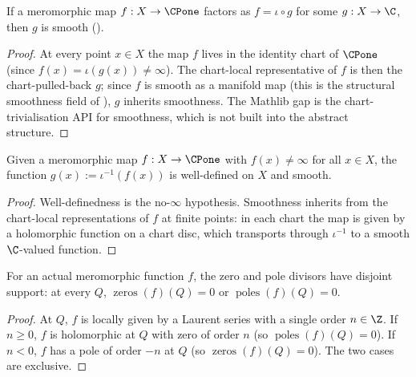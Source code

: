 \begin{lemma}
\label{lem:onepoint-lift-smoothness-inherits}
If a meromorphic map \(f:X\to\CPone\) factors as
\(f=\iota\circ g\) for some \(g:X\to\C\), then \(g\) is smooth
().

\end{lemma}
\begin{proof}

At every point \(x\in X\) the map \(f\) lives in the identity chart
of \(\CPone\) (since \(f(x)=\iota(g(x))\neq\infty\)). The chart-local
representative of \(f\) is then the chart-pulled-back \(g\); since
\(f\) is smooth as a manifold map (this is the structural smoothness
field of ), \(g\) inherits smoothness.
The Mathlib gap is the chart-trivialisation API for
 smoothness, which is not built into
the abstract structure.
\end{proof}

\begin{lemma}
\label{lem:meromorphic-finite-lift-smooth}
Given a meromorphic map \(f:X\to\CPone\) with \(f(x)\neq\infty\) for
all \(x\in X\), the function \(g(x):=\iota^{-1}(f(x))\) is well-defined
on \(X\) and smooth.

\end{lemma}
\begin{proof}

Well-definedness is the no-\(\infty\) hypothesis. Smoothness inherits
from the chart-local representations of \(f\) at finite points: in
each chart the map is given by a holomorphic function on a chart
disc, which transports through \(\iota^{-1}\) to a smooth
\(\C\)-valued function.
\end{proof}

\begin{lemma}
\label{lem:meromorphic-zeros-poles-disjoint}
For an actual meromorphic function \(f\), the zero and pole divisors
have disjoint support: at every \(Q\), \(\operatorname{zeros}(f)(Q)=0\) or
\(\operatorname{poles}(f)(Q)=0\).

\end{lemma}
\begin{proof}
At \(Q\), \(f\) is locally given by a Laurent series with a single
order \(n\in\Z\). If \(n\geq 0\), \(f\) is holomorphic at \(Q\) with
zero of order \(n\) (so \(\operatorname{poles}(f)(Q)=0\)). If \(n<0\), \(f\) has a
pole of order \(-n\) at \(Q\) (so \(\operatorname{zeros}(f)(Q)=0\)). The two cases
are exclusive.
\end{proof}

